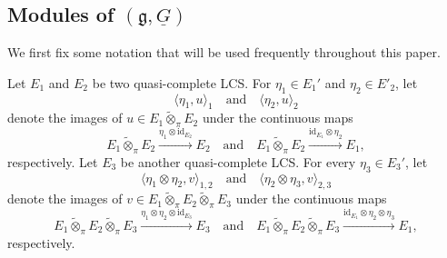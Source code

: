 \documentclass[12pt, a4paper]{amsart}
\newcommand{\BC}{{\mathbb {C}}}
\newcommand{\wt}{\widetilde}
\newcommand{\wh}{\widehat}
\newcommand{\g}{\mathfrak g}
\newcommand{\G}{\mathbf{G}}
\newcommand{\la}{\langle}
\newcommand{\ra}{\rangle}
\newcommand{\be}{\begin {equation}}
\newcommand{\ee}{\end {equation}}
\newcommand{\qaq}{\quad\textrm{and}\quad}
\theoremstyle{Theorem}
\theoremstyle{Theorem}
\theoremstyle{Theorem}
\theoremstyle{Theorem}
\theoremstyle{Plain}
\theoremstyle{remark}
\theoremstyle{remark}
\theoremstyle{Definition}
\numberwithin{equation}{section}
\begin{document}
\subsection{Modules of $(\g,\underline{G})$}




We first fix some notation that will be used frequently throughout this paper.


Let $E_1$ and $E_2$ be two quasi-complete LCS. For  $\eta_1\in E_1'$ and $\eta_2\in E'_2$, let 
\be\label{eq:ra12} \la\eta_1, u\ra_1\qaq\la\eta_2,u\ra_2\ee denote the images of $u\in E_1\wt\otimes_{\pi} E_2$ under the continuous maps
\[E_1\wt\otimes_{\pi} E_2\xrightarrow{\eta_1\otimes \mathrm{id}_{E_2}}E_2\qaq E_1\wt\otimes_{\pi} E_2\xrightarrow{\mathrm{id}_{E_1}\otimes\eta_2 }E_1,\] respectively. 
Let $E_3$ be another quasi-complete LCS.  For every $\eta_3\in E_3'$, let
\be\label{eq:ra123} \la\eta_1\otimes\eta_2,v\ra_{1,2}\qaq\la\eta_2\otimes\eta_3,v\ra_{2,3} \ee denote 
the images of $v\in E_1\wt\otimes_{\pi} E_2\wt\otimes_{\pi} E_3$ under the continuous maps
\[E_1\wt\otimes_{\pi} E_2\wt\otimes_{\pi} E_3\xrightarrow{\eta_1\otimes\eta_2\otimes \mathrm{id}_{E_3}}E_3 \qaq E_1\wt\otimes_{\pi} E_2\wt\otimes_{\pi} E_3\xrightarrow{\mathrm{id}_{E_1}\otimes\eta_2\otimes\eta_3}E_1,\]
respectively. 
\end{document}
